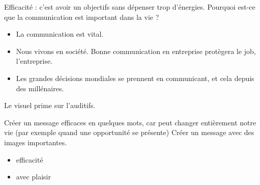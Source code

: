 Efficacité : c'est avoir un objectifs sans dépenser trop d'énergies.
Pourquoi est-ce que la communication est important dans la vie ?
\begin{itemize} 
	\item La communication est vital.
	\item Nous vivons en société. Bonne communication en entreprise protègera le job, l'entreprise.
	\item Les grandes décisions mondiales se prennent en communicant, et cela depuis des millénaires.
\end{itemize}

Le visuel prime sur l'auditifs.

Créer un message efficaces en quelques mots, car peut changer entièrement notre vie (par exemple quand une opportunité se présente)
Créer un message avec des images importantes.

\begin{itemize}
	\item efficacité
	\item avec plaisir
\end{itemize}
